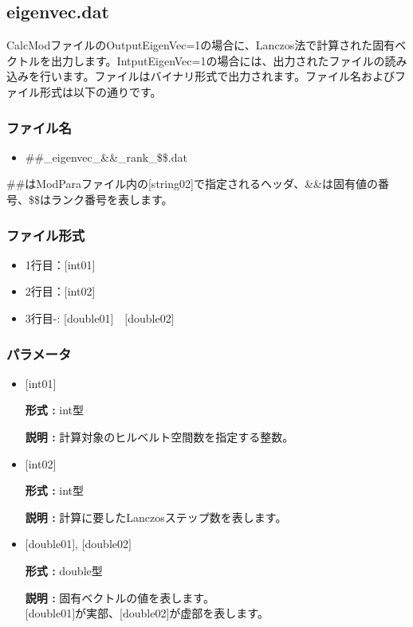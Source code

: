 \newpage
\subsection{eigenvec.dat}
\label{Subsec:eigenvec}
CalcModファイルのOutputEigenVec=1の場合に、Lanczos法で計算された固有ベクトルを出力します。IntputEigenVec=1の場合には、出力されたファイルの読み込みを行います。ファイルはバイナリ形式で出力されます。ファイル名およびファイル形式は以下の通りです。

\subsubsection{ファイル名}
\begin{itemize}
   \item{\#\#\_eigenvec\_{\&\&}\_rank\_\$\$.dat}
\end{itemize}
  \#\#はModParaファイル内の[string02]で指定されるヘッダ、\&\&は固有値の番号、\$\$はランク番号を表します。

\subsubsection{ファイル形式}
 \begin{itemize}
   \item  1行目：$[$int01$]$
   \item  2行目：$[$int02$]$
   \item  3行目-: $[$double01$]$~~$[$double02$]$
  \end{itemize}
\subsubsection{パラメータ}
 \begin{itemize}

  \item  $[$int01$]$

 {\bf 形式 :} int型

{\bf 説明 :} 計算対象のヒルベルト空間数を指定する整数。

  \item  $[$int02$]$

 {\bf 形式 :} int型

{\bf 説明 :} { 計算に要したLanczosステップ数を表します。}
 
 \item  $[$double01$]$, $[$double02$]$

 {\bf 形式 :} double型 

{\bf 説明 :} 固有ベクトルの値を表します。\\
$[$double01$]$が実部、$[$double02$]$が虚部を表します。\\
\end{itemize}

